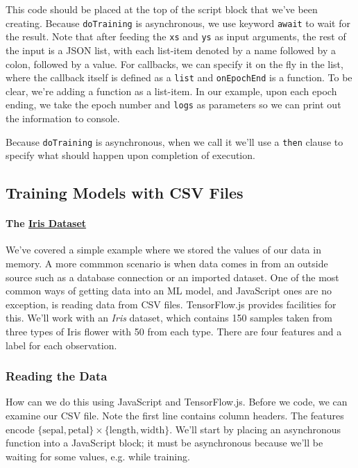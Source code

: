 \documentclass[12pt]{article}
\begin{document}
This code should be placed at the top of the script block that we've been creating. Because \texttt{doTraining} is asynchronous, we use keyword \texttt{await} to wait for the result. Note that after feeding the \texttt{xs} and \texttt{ys} as input arguments, the rest of the input is a JSON list, with each list-item denoted by a name followed by a colon, followed by a value. For callbacks, we can specify it on the fly in the list, where the callback itself is defined as a \texttt{list} and \texttt{onEpochEnd} is a function. To be clear, we're adding a function as a list-item. In our example, upon each epoch ending, we take the epoch number and \texttt{logs} as parameters so we can print out the information to console.

Because \texttt{doTraining} is asynchronous, when we call it we'll use a \texttt{then} clause to specify what should happen upon completion of execution.

\subsection{Training Models with CSV Files}
\paragraph{The \href{https://archive.ics.uci.edu/ml/datasets/iris}{Iris         Dataset}} We've covered a simple example where we stored the values of our data in memory. A more commmon scenario is when data comes in from an outside source such as a database connection or an imported dataset. One of the most common ways of getting data into an ML model, and JavaScript ones are no exception, is reading data from CSV files. TensorFlow.js provides facilities for this. We'll work with an \emph{Iris} dataset, which contains 150 samples taken from three types of Iris flower with 50 from each type. There are four features and a label for each observation.

\subsubsection{Reading the Data} How can we do this using JavaScript and TensorFlow.js. Before we code, we can examine our CSV file. Note the first line contains column headers. The features encode $\{\textrm{sepal}, \textrm{petal}\} \times \{\textrm{length}, \textrm{width}\}$. We'll start by placing an asynchronous function into a JavaScript block; it must be asynchronous because we'll be waiting for some values, e.g. while training.
\end{document}
